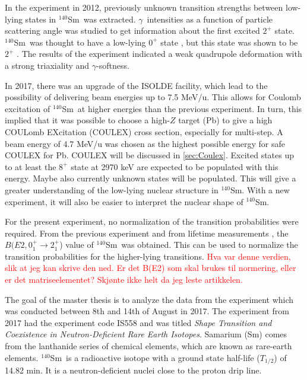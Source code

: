 \documentclass[twoside,english]{uiofysmaster/uiofysmaster}
\newcommand{\Sm}{$^{140}$Sm} %
\newcommand{\ga}{$\gamma$}
\let\orgautoref\autoref
\renewcommand{\autoref}
        {%
		 \def\sectionautorefname{Section}%
		 \def\subsectionautorefname{Section}%
		 \def\subsubsectionautorefname{Section}%
		 \def\chapterautorefname{Chapter}%
          \orgautoref}
\begin{document}
In the experiment in 2012, previously unknown transition strengths between low-lying states in \Sm\ was extracted. 
\ga\ intensities as a function of particle scattering angle was studied to get information about the first excited $2^+$ state.
\Sm\ was thought to have a low-lying $0^+$ state \cite{Firestone}, but this state was shown to be $2^+$ \cite{Samorajczyk2015}. 
The results of the experiment indicated a weak quadrupole deformation with a strong triaxiality and \ga-softness.

In 2017, there was an upgrade of the ISOLDE facility, which lead to the possibility of delivering beam energies up to 7.5 MeV/u. 
This allows for Coulomb excitation of \Sm\ at higher energies than the previous experiment.
In turn, this implied that it was possible to choose a high-$Z$ target (Pb) to give a high COULomb EXcitation (COULEX) cross section, especially for multi-step.
A beam energy of 4.7 MeV/u was chosen as the highest possible energy for safe COULEX for Pb.
COULEX will be discussed in \autoref{sec:Coulex}.
Excited states up to at least the $8^+$ state at 2970 keV are expected to be populated with this energy.
Maybe also currently unknown states will be populated.
This will give a greater understanding of the low-lying nuclear structure in \Sm.
With a new experiment, it will also be easier to interpret the nuclear shape of \Sm.

For the present experiment, no normalization of the transition probabilities were required.
From the previous experiment \cite{Klintefjord2016} and from lifetime measurements \cite{BelloGarrote2015}, the $B(E2, 0_1^+ \rightarrow 2_1^+$) value of \Sm\ was obtained. 
This can be used to normalize the transition probabilities for the higher-lying transitions.
\textcolor{red}{Hva var denne verdien, slik at jeg kan skrive den ned. Er det B(E2) som skal brukes til normering, eller er det matriseelementet? Skjønte ikke helt da jeg leste artikkelen.}

The goal of the master thesis is to analyze the data from the experiment which was conducted between 8th and 14th of August in 2017.  
The experiment from 2017 had the experiment code IS558 and was titled \textit{Shape Transition and Coexistence in Neutron-Deficient Rare Earth Isotopes}.
Samarium (Sm) comes from the lanthanide series of chemical elements, which are known as rare-earth elements.
\Sm\ is a radioactive isotope with a ground state half-life ($T_{1/2}$) of 14.82 min. 
It is a neutron-deficient nuclei close to the proton drip line.
\end{document}
